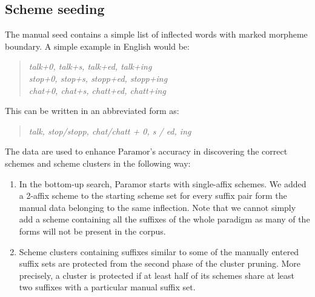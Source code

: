 \documentclass{itatnew}
\newcommand{\e}[1]{\textit{#1}} %
\newcommand{\todoja}[1]{[\textbf{TODOJ} #1]}
\newcommand{\todojd}[1]{} %
\begin{document}
\subsection{Scheme seeding}


\noindent
The manual seed contains a simple list of inflected words with marked morpheme boundary. A simple example in English would be:
\begin{quote}
\e{talk+0, talk+s, talk+ed, talk+ing}\\
\e{stop+0, stop+s, stopp+ed, stopp+ing}\\
\e{chat+0, chat+s, chatt+ed, chatt+ing}
%
\end{quote}

\noindent
This can be written in an abbreviated form as:

\begin{quote}
\e{talk, stop/stopp, chat/chatt +  0, s / ed, ing}
\end{quote}

\noindent
The data are used to enhance Paramor's accuracy in discovering the correct schemes and scheme clusters in the following way:
\begin{enumerate}
\item In the bottom-up search, Paramor starts with single-affix schemes. We added a 2-affix scheme to the starting scheme set for every suffix pair form the manual data belonging to the same inflection. Note that we cannot simply add a scheme containing all the suffixes of the whole paradigm as many of the forms will not be present in the corpus.
    
\item Scheme clusters containing suffixes similar to some of the manually entered suffix sets are protected from the second phase of the cluster pruning. More precisely, a cluster is protected if at least half of its schemes share at least two suffixes with a particular manual suffix set.
\todojd{Is there any reason why half and two, and not, say, 60\% and 3?  \textbf{RK:} Not really -- similar criterion is often used in Paramor so I used it here as well.}



\end{enumerate}
\end{document}
